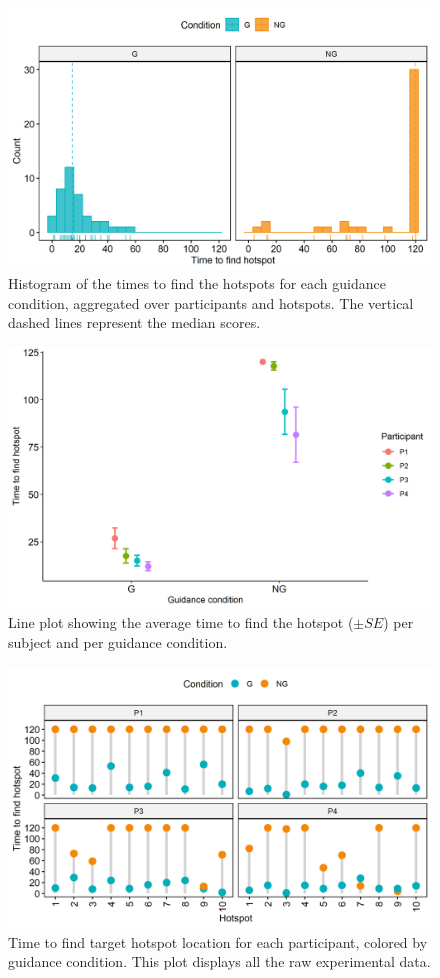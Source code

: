 \documentclass[runningheads]{res/templates/llncs}
\begin{document}
\begin{figure}
\includegraphics[width=12cm, keepaspectratio,]{res/img/hist.png}
\caption{
Histogram of the times to find the hotspots for each guidance condition, aggregated over participants and hotspots. The vertical dashed lines represent the median scores.}
\label{fig:res-ul}
\end{figure}

\begin{figure}
\includegraphics[width=12cm, keepaspectratio,]{res/img/lines.png}
\caption{
Line plot showing the average time to find the hotspot ($\pm{SE}$) per subject and per guidance condition.}
\label{fig:res-ur}
\end{figure}

\begin{figure}
\includegraphics[width=12cm, keepaspectratio,]{res/img/full.png}
\caption{
Time to find target hotspot location for each participant, colored by guidance condition. This plot displays all the raw experimental data.}
\label{fig:res-full}
\end{figure}
\end{document}
